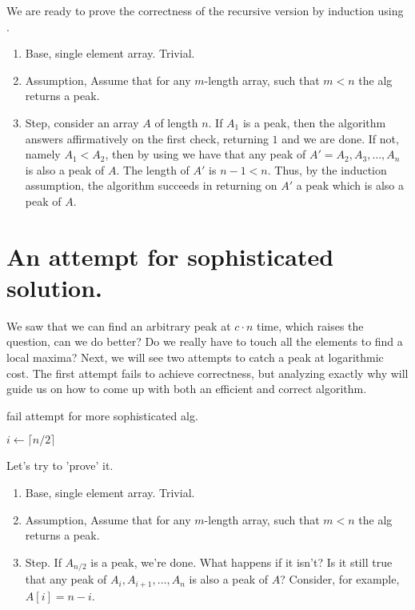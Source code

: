 We are ready to prove the correctness of the recursive version by induction using . 

\begin{enumerate}
  \item Base, single element array. Trivial. 
  \item Assumption, Assume that for any $m$-length array, such that $m<n$ the alg returns a peak. 
  \item Step, consider an array $A$ of length $n$. If $A_1$ is a peak, then the algorithm answers affirmatively on the first check, returning $1$ and we are done. If not, namely $A_1 < A_2$, then by using  we have that any peak of $A' = A_2, A_3, \dots, A_n$ is also a peak of $A$. The length of $A'$ is $n-1 < n$. Thus, by the induction assumption, the algorithm succeeds in returning on $A'$ a peak which is also a peak of $A$.
\end{enumerate}

\section{An attempt for sophisticated solution.}
We saw that we can find an arbitrary peak at $c\cdot n$ time, which raises the question, can we do better? Do we really have to touch all the elements to find a local maxima? Next, we will see two attempts to catch a peak at logarithmic cost. The first attempt fails to achieve correctness, but analyzing exactly why will guide us on how to come up with both an efficient and correct algorithm.
\begin{algorithm}
\caption{fail attempt for more sophisticated alg. }
        $ i \leftarrow  \lceil n/2 \rceil $\\
\end{algorithm}

Let's try to 'prove' it.  
\begin{enumerate}
 \item Base, single element array. Trivial. 
  \item Assumption, Assume that for any $m$-length array, such that $m<n$ the alg returns a peak. 
  \item Step. If $A_{n/2}$ is a peak, we're done. What happens if it isn't? Is it still true that any peak of $A_{i},A_{i+1}, \ldots, A_{n}$ is also a peak of $A$? Consider, for example, $A[i] = n - i$.
\end{enumerate}

